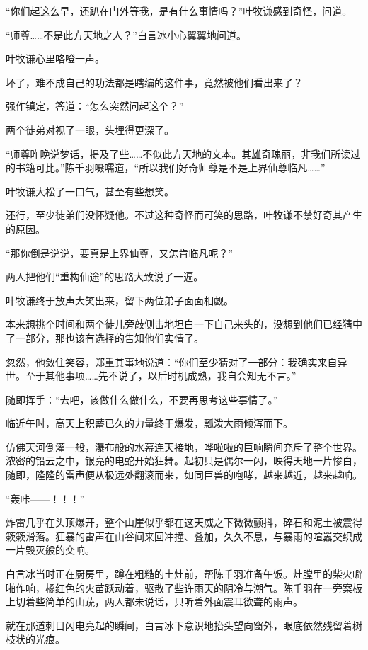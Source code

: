 “你们起这么早，还趴在门外等我，是有什么事情吗？”叶牧谦感到奇怪，问道。

“师尊……不是此方天地之人？”白言冰小心翼翼地问道。

叶牧谦心里咯噔一声。

坏了，难不成自己的功法都是瞎编的这件事，竟然被他们看出来了？

强作镇定，答道：“怎么突然问起这个？”

两个徒弟对视了一眼，头埋得更深了。

“师尊昨晚说梦话，提及了些……不似此方天地的文本。其雄奇瑰丽，非我们所读过的书籍可比。”陈千羽嗫嚅道，“所以我们好奇师尊是不是上界仙尊临凡……”

叶牧谦大松了一口气，甚至有些想笑。

还行，至少徒弟们没怀疑他。不过这种奇怪而可笑的思路，叶牧谦不禁好奇其产生的原因。

“那你倒是说说，要真是上界仙尊，又怎肯临凡呢？”

两人把他们“重构仙途”的思路大致说了一遍。

叶牧谦终于放声大笑出来，留下两位弟子面面相觑。

本来想挑个时间和两个徒儿旁敲侧击地坦白一下自己来头的，没想到他们已经猜中了一部分，那也该有选择的告知他们实情了。

忽然，他敛住笑容，郑重其事地说道：“你们至少猜对了一部分：我确实来自异世。至于其他事项……先不说了，以后时机成熟，我自会知无不言。”

随即挥手：“去吧，该做什么做什么，不要再思考这些事情了。”

\vspace{2em}

临近午时，高天上积蓄已久的力量终于爆发，瓢泼大雨倾泻而下。

仿佛天河倒灌一般，瀑布般的水幕连天接地，哗啦啦的巨响瞬间充斥了整个世界。浓密的铅云之中，银亮的电蛇开始狂舞。起初只是偶尔一闪，映得天地一片惨白，随即，隆隆的雷声便从极远处翻滚而来，如同巨兽的咆哮，越来越近，越来越响。

“轰咔——！！！”

炸雷几乎在头顶爆开，整个山崖似乎都在这天威之下微微颤抖，碎石和泥土被震得簌簌滑落。狂暴的雷声在山谷间来回冲撞、叠加，久久不息，与暴雨的喧嚣交织成一片毁灭般的交响。

白言冰当时正在厨房里，蹲在粗糙的土灶前，帮陈千羽准备午饭。灶膛里的柴火噼啪作响，橘红色的火苗跃动着，驱散了些许雨天的阴冷与潮气。陈千羽在一旁案板上切着些简单的山蔬，两人都未说话，只听着外面震耳欲聋的雨声。

就在那道刺目闪电亮起的瞬间，白言冰下意识地抬头望向窗外，眼底依然残留着树枝状的光痕。

